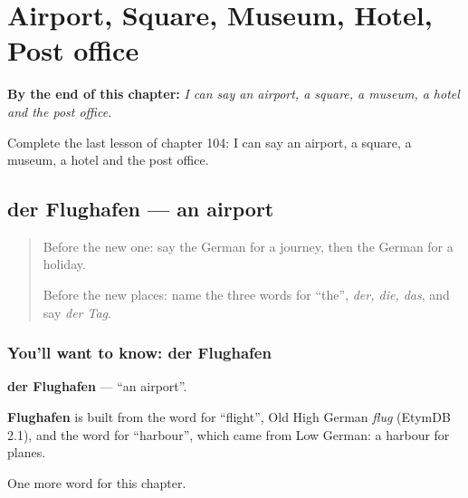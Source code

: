 
\chapter{Airport, Square, Museum, Hotel, Post office}
\label{ch:ge-airport-square-museum-hotel-post-office}

\begin{chapteropening}
\textbf{By the end of this chapter:} \emph{I can say an airport, a square, a museum, a hotel and the post office.}

Complete the last lesson of chapter 104: I can say an airport, a square, a museum, a hotel and the post office.
\end{chapteropening}

\section[der Flughafen]{der Flughafen — an airport}

\label{lesson:GE-C104-flughafen}



\begin{quote}
Before the new one: say the German for a journey, then the German for a holiday.

Before the new places: name the three words for \textquotedblleft{}the\textquotedblright{}, \emph{der, die, das}, and say \emph{der Tag}.
\end{quote}

\subsection*{You'll want to know: der Flughafen}
\textbf{der Flughafen} — \textquotedblleft{}an airport\textquotedblright{}.

\begin{cousinweb}
\textbf{Flughafen} is built from the word for \textquotedblleft{}flight\textquotedblright{}, Old High German \emph{flug} (EtymDB 2.1), and the word for \textquotedblleft{}harbour\textquotedblright{}, which came from Low German: a harbour for planes.
\end{cousinweb}

\begin{grammarlens}[title={What you've built}]
One more word for this chapter.
\end{grammarlens}


